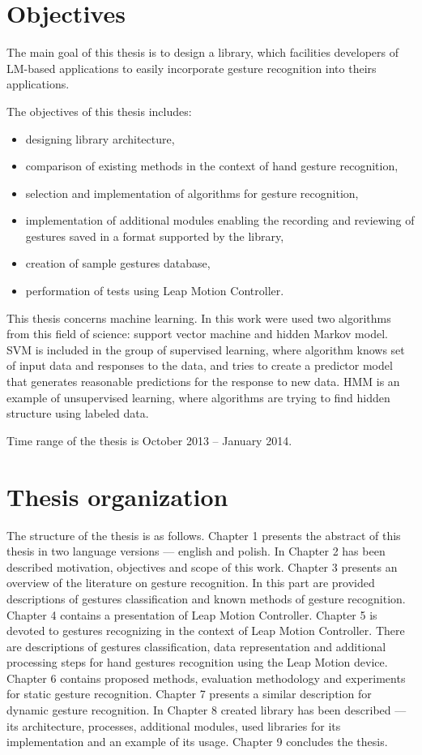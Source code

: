 \section{Objectives}

The main goal of this thesis is to design a library, which facilities developers of LM-based applications to easily incorporate gesture recognition into theirs applications.

The objectives of this thesis includes:
\begin{itemize}
\item designing library architecture, 
\item comparison of existing methods in the context of hand gesture recognition,
\item selection and implementation of algorithms for gesture recognition,
\item implementation of additional modules enabling the recording and reviewing of gestures saved in a format supported by the library,
\item creation of sample gestures database,
\item performation of tests using Leap Motion Controller.
\end{itemize}

This thesis concerns machine learning. In this work were used two algorithms from this field of science: support vector machine and hidden Markov model. SVM is included in the group of supervised learning, where algorithm knows set of input data and responses to the data, and tries to create a predictor model that generates reasonable predictions for the response to new data. HMM is an example of unsupervised learning, where algorithms are trying to find hidden structure using labeled data. 

Time range of the thesis is October 2013 -- January 2014.



\section{Thesis organization}
The structure of the thesis is as follows. Chapter 1 presents the abstract of this thesis in two language versions --- english and polish. In Chapter 2 has been described motivation, objectives and scope of this work. Chapter 3 presents an overview of the literature on gesture recognition. In this part are provided descriptions of gestures classification and known methods of gesture recognition. Chapter 4 contains a presentation of Leap Motion Controller. Chapter 5 is devoted to gestures recognizing in the context of Leap Motion Controller. There are descriptions of gestures classification, data representation and additional processing steps for hand gestures recognition using the Leap Motion device. Chapter 6 contains proposed methods, evaluation methodology and experiments for static gesture recognition. Chapter 7 presents a similar description for dynamic gesture recognition. In Chapter 8 created library has been described --- its architecture, processes, additional modules, used libraries for its implementation and an example of its usage. Chapter 9 concludes the thesis. 


